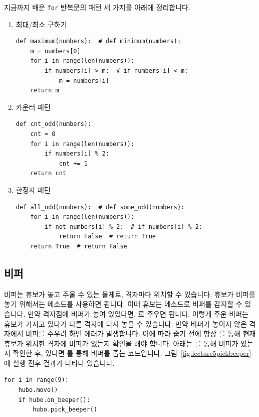 \documentclass[../main.tex]{subfiles}
\begin{document}
지금까지 배운 \texttt{for} 반복문의 패턴 세 가지를 아래에 정리합니다.
\begin{enumerate}
\item 최대/최소 구하기
\begin{verbatim}
def maximum(numbers):  # def minimum(numbers):
    m = numbers[0]
    for i in range(len(numbers)):
        if numbers[i] > m:  # if numbers[i] < m:
            m = numbers[i]
    return m
\end{verbatim}
\item 카운터 패턴
\begin{verbatim}
def cnt_odd(numbers):
    cnt = 0
    for i in range(len(numbers)):
        if numbers[i] % 2:
            cnt += 1
    return cnt
\end{verbatim}
\item 한정자 패턴
\begin{verbatim}
def all_odd(numbers):  # def some_odd(numbers):
    for i in range(len(numbers)):
        if not numbers[i] % 2:  # if numbers[i] % 2:
            return False  # return True
    return True  # return False
\end{verbatim}
\end{enumerate}

\subsection{비퍼}
비퍼는 휴보가 놓고 주울 수 있는 물체로, 격자마다 위치할 수 있습니다.
휴보가 비퍼를 놓기 위해서는  메소드를 사용하면 됩니다.
이때 휴보는  메소드로 비퍼를 감지할 수 있습니다.
만약 격자점에 비퍼가 놓여 있었다면, 로 주우면 됩니다.
이렇게 주운 비퍼는 휴보가 가지고 있다가 다른 격자에 다시 놓을 수 있습니다.
만약 비퍼가 놓이지 않은 격자에서 비퍼를 주우려 하면 에러가 발생합니다.
이에 따라 줍기 전에 항상 를 통해 현재 휴보가 위치한 격자에 비퍼가 있는지 확인을 해야 합니다.
아래는 를 통해 비퍼가 있는지 확인한 후, 있다면 를 통해 비퍼를 줍는 코드입니다.
그림~\ref{fig:lecture5pickbeeper}에 실행 전후 결과가 나타나 있습니다.
\begin{verbatim}
for i in range(9):
    hubo.move()
    if hubo.on_beeper():
        hubo.pick_beeper()
      \end{verbatim}
\end{document}

